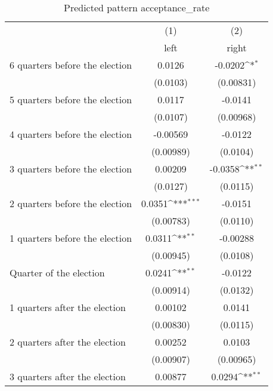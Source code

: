 \begin{table}[htbp]\centering
\def\sym#1{\ifmmode^{#1}\else\(^{#1}\)\fi}
\caption{Predicted pattern acceptance\_rate}
\begin{tabular}{l*{2}{c}}
\hline\hline
                    &\multicolumn{1}{c}{(1)}&\multicolumn{1}{c}{(2)}\\
                    &\multicolumn{1}{c}{left}&\multicolumn{1}{c}{right}\\
\hline
 6 quarters before the election&      0.0126         &     -0.0202\sym{*}  \\
                    &    (0.0103)         &   (0.00831)         \\
[1em]
 5 quarters before the election&      0.0117         &     -0.0141         \\
                    &    (0.0107)         &   (0.00968)         \\
[1em]
 4 quarters before the election&    -0.00569         &     -0.0122         \\
                    &   (0.00989)         &    (0.0104)         \\
[1em]
 3 quarters before the election&     0.00209         &     -0.0358\sym{**} \\
                    &    (0.0127)         &    (0.0115)         \\
[1em]
 2 quarters before the election&      0.0351\sym{***}&     -0.0151         \\
                    &   (0.00783)         &    (0.0110)         \\
[1em]
 1 quarters before the election&      0.0311\sym{**} &    -0.00288         \\
                    &   (0.00945)         &    (0.0108)         \\
[1em]
Quarter of the election&      0.0241\sym{**} &     -0.0122         \\
                    &   (0.00914)         &    (0.0132)         \\
[1em]
 1 quarters after the election&     0.00102         &      0.0141         \\
                    &   (0.00830)         &    (0.0115)         \\
[1em]
 2 quarters after the election&     0.00252         &      0.0103         \\
                    &   (0.00907)         &   (0.00965)         \\
[1em]
 3 quarters after the election&     0.00877         &      0.0294\sym{**} \\

\end{tabular}
\end{table}
